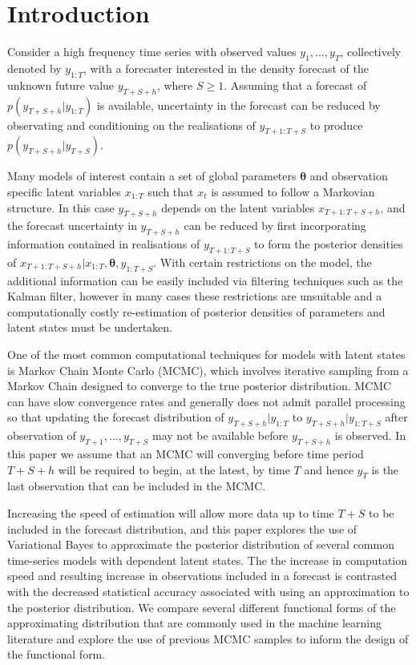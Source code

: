 \documentclass[12pt,a4paper]{article}%
\numberwithin{equation}{section}
\begin{document}
\section{Introduction}

Consider a high frequency time series with observed values $y_{1}, \dots, y_{T}$, collectively denoted by $y_{1:T}$, with a forecaster interested in the density forecast of the unknown future value $y_{T+S+h}$, where $S \geq 1$. Assuming that a forecast of $p(y_{T+S+h} | y_{1:T})$ is available, uncertainty in the forecast can be reduced by observating and conditioning on the realisations of $y_{T+1:T+S}$ to produce $p(y_{T+S+h} | y_{T+S})$. 

Many models of interest contain a set of global parameters $\boldsymbol{\theta}$ and observation specific latent variables $x_{1:T}$ such that $x_t$ is assumed to follow a Markovian structure. In this case $y_{T+S+h}$ depends on the latent variables $x_{T+1:T+S+h}$, and the forecast uncertainty in $y_{T+S+h}$ can be reduced by first incorporating information contained in realisations of $y_{T+1:T+S}$ to form the posterior densities of $x_{T+1:T+S+h} | x_{1:T}, \boldsymbol{\theta}, y_{1:T+S}$. With certain restrictions on the model, the additional information can be easily included via filtering techniques such as the Kalman filter, however in many cases these restrictions are unsuitable and a computationally costly re-estimation of posterior densities of parameters and latent states must be undertaken.

One of the most common computational techniques for models with latent states is Markov Chain Monte Carlo (MCMC), which involves iterative sampling from a Markov Chain designed to converge to the true posterior distribution. MCMC can have slow convergence rates and generally does not admit parallel processing so that updating the forecast distribution of $y_{T+S+h} | y_{1:T}$ to $y_{T+S+h} | y_{1:T+S}$ after observation of $y_{T+1}, \dots, y_{T+S}$ may not be available before $y_{T+S+h}$ is observed. In this paper we assume that an MCMC will converging before time period $T + S + h$ will be required to begin, at the latest, by time $T$ and hence $y_{T}$ is the last observation that can be included in the MCMC. 

Increasing the speed of estimation will allow more data up to time $T + S$ to be included in the forecast distribution, and this paper explores the use of Variational Bayes to approximate the posterior distribution of several common time-series models with dependent latent states. The the increase in computation speed and resulting increase in observations included in a forecast is contrasted with the decreased statistical accuracy associated with using an approximation to the posterior distribution. We compare several different functional forms of the approximating distribution that are commonly used in the machine learning literature and explore the use of previous MCMC samples to inform the design of the functional form.
\end{document}
